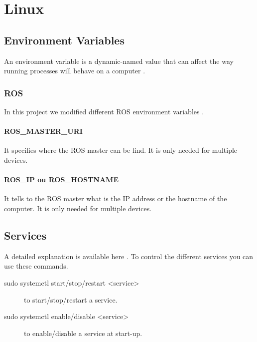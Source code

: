 \chapter{Linux}

\section{Environment Variables}
An environment variable is a dynamic-named value that can affect the way running processes will behave on a computer \cite{wikipedia_env_var}.
\subsection{ROS}
In this project we modified different ROS environment variables \cite{ros_env_var}.
\subsubsection{ROS\_MASTER\_URI}
It specifies where the ROS master can be find.
It is only needed for multiple devices.

\subsubsection{ROS\_IP ou ROS\_HOSTNAME}
It tells to the ROS master what is the IP address or the hostname of the computer.
It is only needed for multiple devices.

\section{Services} \label{services}
A detailed explanation is available here \cite{techrepublic_services}.
To control the different services you can use these commands.
\begin{description}
    \item[sudo systemctl start/stop/restart <service>] to start/stop/restart a service.
    \item[sudo systemctl enable/disable <service>] to enable/disable a service at start-up.
\end{description}

